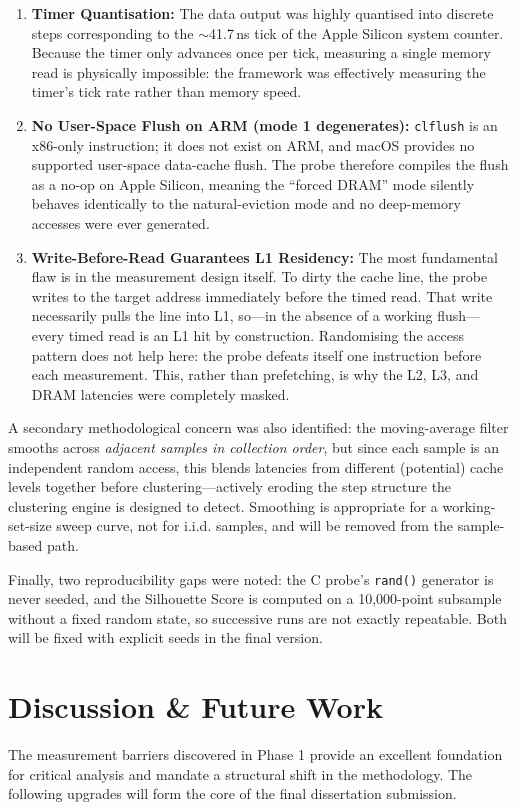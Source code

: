 \documentclass[conference]{IEEEtran}
\begin{document}
\begin{enumerate}
    \item \textbf{Timer Quantisation:} The data output was highly quantised into discrete steps corresponding to the $\sim$41.7\,ns tick of the Apple Silicon system counter. Because the timer only advances once per tick, measuring a single memory read is physically impossible: the framework was effectively measuring the timer's tick rate rather than memory speed.
    \item \textbf{No User-Space Flush on ARM (mode 1 degenerates):} \texttt{clflush} is an x86-only instruction; it does not exist on ARM, and macOS provides no supported user-space data-cache flush. The probe therefore compiles the flush as a no-op on Apple Silicon, meaning the ``forced DRAM'' mode silently behaves identically to the natural-eviction mode and no deep-memory accesses were ever generated.
    \item \textbf{Write-Before-Read Guarantees L1 Residency:} The most fundamental flaw is in the measurement design itself. To dirty the cache line, the probe writes to the target address immediately before the timed read. That write necessarily pulls the line into L1, so---in the absence of a working flush---every timed read is an L1 hit by construction. Randomising the access pattern does not help here: the probe defeats itself one instruction before each measurement. This, rather than prefetching, is why the L2, L3, and DRAM latencies were completely masked.
\end{enumerate}

A secondary methodological concern was also identified: the moving-average filter smooths across \textit{adjacent samples in collection order}, but since each sample is an independent random access, this blends latencies from different (potential) cache levels together before clustering---actively eroding the step structure the clustering engine is designed to detect. Smoothing is appropriate for a working-set-size sweep curve, not for i.i.d. samples, and will be removed from the sample-based path.

Finally, two reproducibility gaps were noted: the C probe's \texttt{rand()} generator is never seeded, and the Silhouette Score is computed on a 10,000-point subsample without a fixed random state, so successive runs are not exactly repeatable. Both will be fixed with explicit seeds in the final version.

\section{Discussion \& Future Work}
The measurement barriers discovered in Phase 1 provide an excellent foundation for critical analysis and mandate a structural shift in the methodology. The following upgrades will form the core of the final dissertation submission.
\end{document}
